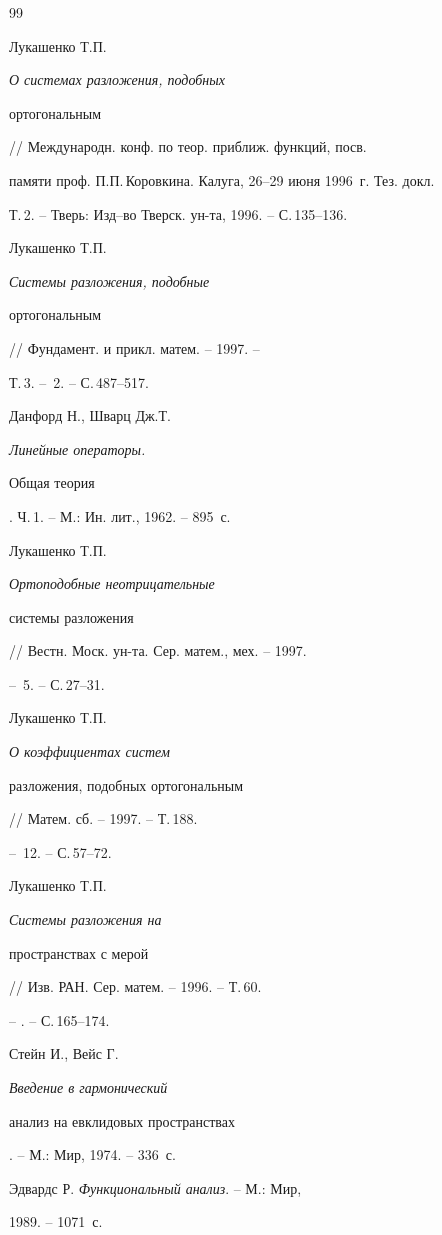 \begin{thebibliography}{99}







Лукашенко Т.П. {\em О системах разложения, подобных


ортогональным} // Международн. конф. по теор. приближ. функций, посв.


памяти проф. П.П.\,Коровкина. Калуга, 26--29 июня 1996~г. Тез. докл.


Т.\,2. -- Тверь: Изд--во Тверск. ун-та, 1996. -- С.\,135--136.




Лукашенко Т.П. {\em Системы разложения, подобные


ортогональным} // Фундамент. и прикл. матем. -- 1997. --


Т.\,3. -- \No\,2. -- С.\,487--517.




Данфорд Н., Шварц Дж.Т. {\em Линейные операторы.


Общая теория}. Ч.\,1. -- М.: Ин. лит., 1962. -- 895~с.




Лукашенко Т.П. {\em Ортоподобные неотрицательные


системы разложения} // Вестн. Моск. ун-та. Сер. матем., мех. -- 1997.


-- \No\,5. -- С.\,27--31.




Лукашенко Т.П. {\em О коэффициентах систем


разложения, подобных ортогональным} // Матем. сб. -- 1997. -- Т.\,188.


-- \No\,12. -- С.\,57--72.




Лукашенко Т.П. {\em Системы разложения на


пространствах с мерой} // Изв. РАН. Сер. матем. -- 1996. -- Т.\,60.


-- . -- С.\,165--174.




Стейн И., Вейс Г. {\em Введение в гармонический


анализ на евклидовых пространствах}. -- М.: Мир, 1974. -- 336~с.




Эдвардс Р. {\em Функциональный анализ}. -- М.: Мир,


1989. -- 1071~с.



\end{thebibliography}

